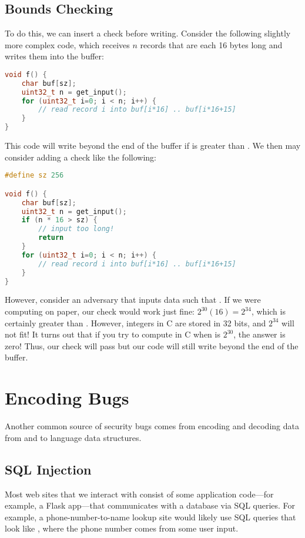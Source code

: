 \subsection{Bounds Checking}
To do this, we can insert a check before writing. Consider the following slightly more complex code, which receives $n$ records that are each 16 bytes long and writes them into the buffer:

\begin{lstlisting}[language=c]
void f() {
	char buf[sz];
	uint32_t n = get_input();
	for (uint32_t i=0; i < n; i++) {
		// read record i into buf[i*16] .. buf[i*16+15]
	}
}
\end{lstlisting}

This code will write beyond the end of the buffer if  is greater than . We then may consider adding a check like the following:
\begin{lstlisting}[language=c]
#define sz 256

void f() {
	char buf[sz];
	uint32_t n = get_input();
	if (n * 16 > sz) {
		// input too long!
		return
	}
	for (uint32_t i=0; i < n; i++) {
		// read record i into buf[i*16] .. buf[i*16+15]
	}
}
\end{lstlisting}

However, consider an adversary that inputs data such that . If we were computing on paper, our check would work just fine: $2^{30}(16) = 2^34$, which is certainly greater than . However, integers in C are stored in 32 bits, and $2^34$ will not fit! It turns out that if you try to compute  in C when  is $2^{30}$, the answer is zero! Thus, our check will pass but our code will still write beyond the end of the buffer. 


\section{Encoding Bugs}
Another common source of security bugs comes from encoding and decoding data from and to language data structures.

\subsection{SQL Injection}
Most web sites that we interact with consist of some application code---for example, a Flask app---that communicates with a database via SQL queries. For example, a phone-number-to-name lookup site would likely use SQL queries that look like , where the phone number comes from some user input.

